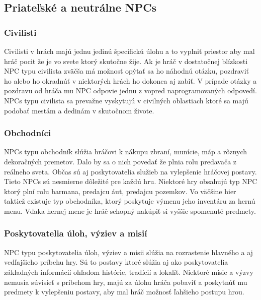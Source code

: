 \documentclass[10pt,twoside,slovak,a4paper]{article}
\begin{document}
\subsection{Priateľské a neutrálne NPCs}  \label{Ally & non}  

\subsubsection{Civilisti} 
Civilisti v hrách majú jednu jedinú špecifickú úlohu a to vyplniť priestor aby mal hráč pocit že je vo svete ktorý skutočne žije. Ak je hráč v dostatočnej blízkosti NPC typu civilista zväčša má možnosť opýtať sa ho náhodnú otázku, pozdraviť ho alebo ho okradnúť v niektorých hrách ho dokonca aj zabiť. V prípade otázky a pozdravu od hráča mu NPC odpovie jednu z vopred naprogramovaných odpovedí. NPCs typu civilista sa prevažne vyskytujú v civilných oblastiach ktoré sa majú podobať mestám a dedinám v skutočnom živote.  


\subsubsection{Obchodníci}
NPCs typu obchodník slúžia hráčovi k nákupu zbraní, munície, máp a rôznych dekoračných premetov. Dalo by sa o nich povedať že plnia rolu predavača z reálneho sveta. Občas sú aj poskytovatelia služieb na vylepšenie hráčovej postavy. Tieto NPCs sú nesmierne dôležité pre každú hru. Niektoré hry obsahujú typ NPC ktorý plní rolu barmana, predajcu áut, predajcu pozemkov. Vo väčšine hier taktiež existuje typ obchodníka, ktorý poskytuje výmenu jeho inventáru za hernú menu. Vďaka hernej mene je hráč schopný nakúpiť si vyššie spomenuté predmety.  


\subsubsection{Poskytovatelia úloh, výziev a misií}
NPC typu poskytovatelia úloh, výziev a misii slúžia na rozrastenie hlavného a aj vedľajšieho príbehu hry. Sú to postavy ktoré slúžia aj ako poskytovatelia základných informácií ohľadom histórie, tradícií a lokalít. Niektoré misie a výzvy nemusia súvisieť s príbehom hry, majú za úlohu hráča pobaviť a poskytnúť mu predmety k vylepšeniu postavy, aby mal hráč možnosť ľahšieho postupu hrou. 
\end{document}
